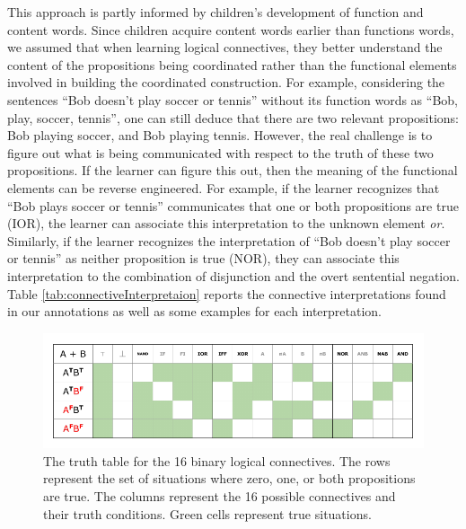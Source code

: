 \documentclass[floatsintext,man]{apa6}
\theoremstyle{definition}
\theoremstyle{definition}
\theoremstyle{definition}
\theoremstyle{remark}
\begin{document}
This approach is partly informed by children's development of function
and content words. Since children acquire content words earlier than
functions words, we assumed that when learning logical connectives, they
better understand the content of the propositions being coordinated
rather than the functional elements involved in building the coordinated
construction. For example, considering the sentences \enquote{Bob
doesn't play soccer or tennis} without its function words as
\enquote{Bob, play, soccer, tennis}, one can still deduce that there are
two relevant propositions: Bob playing soccer, and Bob playing tennis.
However, the real challenge is to figure out what is being communicated
with respect to the truth of these two propositions. If the learner can
figure this out, then the meaning of the functional elements can be
reverse engineered. For example, if the learner recognizes that
\enquote{Bob plays soccer or tennis} communicates that one or both
propositions are true (IOR), the learner can associate this
interpretation to the unknown element \emph{or}. Similarly, if the
learner recognizes the interpretation of \enquote{Bob doesn't play
soccer or tennis} as neither proposition is true (NOR), they can
associate this interpretation to the combination of disjunction and the
overt sentential negation. Table \ref{tab:connectiveInterpretaion}
reports the connective interpretations found in our annotations as well
as some examples for each interpretation.

\begin{figure}[tb]

{\centering \includegraphics{figs/logicalConnectives-1} 

}

\caption{The truth table for the 16 binary logical connectives. The rows represent the set of situations where zero, one, or both propositions are true. The columns represent the 16 possible connectives and their truth conditions. Green cells represent true situations.}\label{fig:logicalConnectives}
\end{figure}
\end{document}
